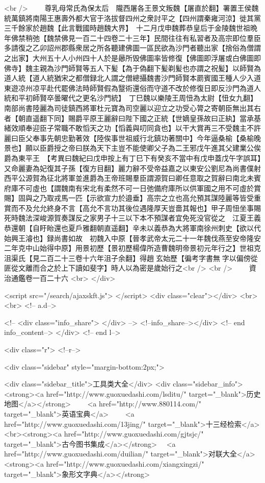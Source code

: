 <br />
　　尊乳母常氏為保太后　隴西屠各王景文叛魏【屠直於翻】署置王侯魏統萬鎮將南陽王惠壽外都大官于洛拔督四州之衆討平之【四州謂秦雍河涼】徙其黨三千餘家於趙魏【此言戰國時趙魏大界】　十二月戊申魏葬恭皇后于金陵魏世祖晩年佛禁稍弛【魏禁佛見一百二十四卷二十三年】民間往往有私習者及高宗即位羣臣多請復之乙卯詔州郡縣衆居之所各聽建佛圖一區民欲為沙門者聽出家【捨俗為僧謂之出家】大州五十人小州四十人於是曏所毁佛圖率皆修復【佛圖即浮屠或白佛圖即佛寺】魏主親為沙門師賢等五人下髪【為于偽翻下髪剃髪也亦謂之祝髪】以師賢為道人統【道人統猶宋之都僧録北人謂之僧總攝魏書沙門師賢本罽賓國王種人少入道東遊凉州凉平赴代罷佛法時師賢假為毉術還俗而守道不改於修復日即反沙門為道人統和平初師賢卒曇曜代之更名沙門統】　丁巳魏以樂陵王周忸為太尉【忸女九翻】南部尚書陸麗為司徒鎮西將軍杜元寶為司空麗以迎立之功受心膂之寄朝臣無出其右者【朝直遥翻下同】賜爵平原王麗辭曰陛下國之正統【世嫡皇孫故曰正紈】當承基緒效順奉迎臣子常職不敢慆天之功【慆義與叨同貪也】以干大賞再三不受魏主不許麗曰臣父奉事先朝忠勤著效【陸俟事世祖威行北鎮功著關中】今年逼桑榆【桑榆晚景也】願以臣爵授之帝曰朕為天下主豈不能使卿父子為二王邪戊午進其父建業公俟爵為東平王　【考異曰魏紀曰戊申按上有丁巳下有癸亥不當中有戊申蓋戊午字誤耳】又命麗妻為妃復其子孫【復方目翻】麗力辭不受帝益嘉之以東安公劉尼為尚書僕射西平公源賀為征北將軍並進爵為王帝班賜羣臣謂源賀曰卿任意取之賀辭曰南北未賓府庫不可虛也【謂魏南有宋北有柔然不可一日弛備府庫所以供軍國之用不可虛於賞賜】固與之乃取戎馬一匹【示欲宣力於邉垂】高宗之立也高允預其謀陸麗等皆受重賞而不及允允終身不言【高允不言功其後位遇隆厚天豈嗇其報也】甲子周忸坐事賜死時魏法深峻源賀奏謀反之家男子十三以下本不預謀者宜免死没官從之　江夏王義恭還朝【自盱眙還也夏戶雅翻朝直遥翻】辛未以義恭為大將軍南徐州刺史【欲以代始興王濬也】録尚書如故　初魏入中原【晉孝武帝太元二十一年魏伐燕至安帝隆安二年克中山始得中原】用景初歷【景初歷楊偉所造曹魏明帝景初元年行之】世祖克沮渠氏【見二百二十三卷十六年沮子余翻】得趙玄始歷【徧考字書無字以偏傍從匪從文離而合之於上下讀如斐字】時人以為密是歲始行之<br />
<br />
　　資治通鑑卷一百二十六  <br>
   </div> 

<script src="/search/ajaxskft.js"> </script>
 <div class="clear"></div>
<br>
<br>
 <!-- a.d-->

 <!--
<div class="info_share">
</div> 
-->
 <!--info_share--></div>   <!-- end info_content-->
  </div> <!-- end l-->

<div class="r">   <!--r-->



<div class="sidebar"  style="margin-bottom:2px;">

 
<div class="sidebar_title">工具类大全</div>
<div class="sidebar_info">
<strong><a href="http://www.guoxuedashi.com/lsditu/" target="_blank">历史地图</a></strong>　　
<a href="http://www.880114.com/" target="_blank">英语宝典</a>　　
<a href="http://www.guoxuedashi.com/13jing/" target="_blank">十三经检索</a>　
<br><strong><a href="http://www.guoxuedashi.com/gjtsjc/" target="_blank">古今图书集成</a></strong>　
<a href="http://www.guoxuedashi.com/duilian/" target="_blank">对联大全</a>　<strong><a href="http://www.guoxuedashi.com/xiangxingzi/" target="_blank">象形文字典</a></strong>　

